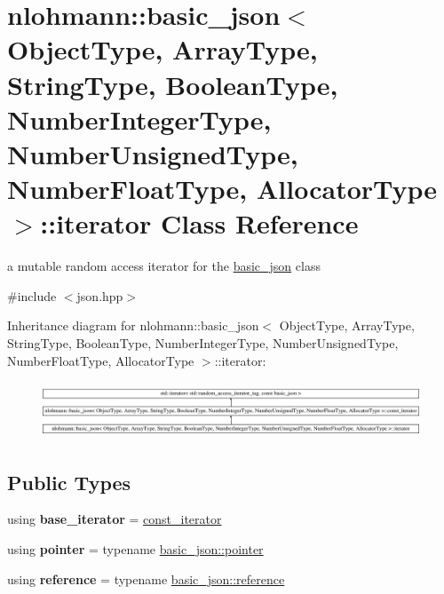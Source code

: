 \hypertarget{classnlohmann_1_1basic__json_1_1iterator}{}\section{nlohmann\+:\+:basic\+\_\+json$<$ Object\+Type, Array\+Type, String\+Type, Boolean\+Type, Number\+Integer\+Type, Number\+Unsigned\+Type, Number\+Float\+Type, Allocator\+Type $>$\+:\+:iterator Class Reference}
\label{classnlohmann_1_1basic__json_1_1iterator}


a mutable random access iterator for the \hyperlink{classnlohmann_1_1basic__json}{basic\+\_\+json} class  




{\ttfamily \#include $<$json.\+hpp$>$}

Inheritance diagram for nlohmann\+:\+:basic\+\_\+json$<$ Object\+Type, Array\+Type, String\+Type, Boolean\+Type, Number\+Integer\+Type, Number\+Unsigned\+Type, Number\+Float\+Type, Allocator\+Type $>$\+:\+:iterator\+:\begin{figure}[H]
\begin{center}
\leavevmode
\includegraphics[height=1.705584cm]{classnlohmann_1_1basic__json_1_1iterator}
\end{center}
\end{figure}
\subsection*{Public Types}
\begin{DoxyCompactItemize}
\item 
\mbox{\label{classnlohmann_1_1basic__json_1_1iterator_ac48754e4dc48d65d95294bd170dcd857}} 
using {\bfseries base\+\_\+iterator} = \hyperlink{classnlohmann_1_1basic__json_1_1const__iterator}{const\+\_\+iterator}
\item 
\mbox{\label{classnlohmann_1_1basic__json_1_1iterator_a3aae1df93a78b201d98e178c1c7d02a7}} 
using {\bfseries pointer} = typename \hyperlink{classnlohmann_1_1basic__json_a9d1b58099dc64695fcf2847ab0b2a7c7}{basic\+\_\+json\+::pointer}
\item 
\mbox{\label{classnlohmann_1_1basic__json_1_1iterator_a97aff5d71246774267a81066460dd1cf}} 
using {\bfseries reference} = typename \hyperlink{classnlohmann_1_1basic__json_a3ec8e17be8732fe436e9d6733f52b7a3}{basic\+\_\+json\+::reference}
\end{DoxyCompactItemize}
